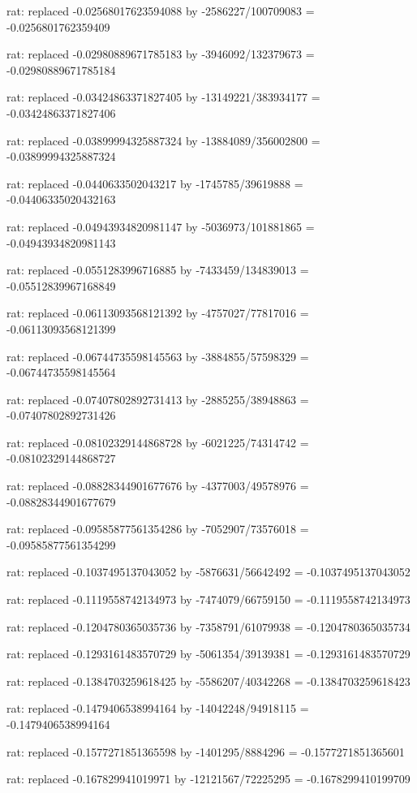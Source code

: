 \documentclass[a4paper,10pt]{article}
\begin{document}
\begin{eulernotebook}
\begin{eulercomment}
\begin{eulercomment}
\begin{eulercomment}
\begin{eulercomment}
\begin{eulercomment}
\begin{eulercomment}
\begin{eulercomment}
\begin{eulercomment}
\begin{eulercomment}
\begin{eulercomment}
\begin{eulercomment}
\begin{eulercomment}
\begin{eulercomment}
\begin{eulercomment}
\begin{eulercomment}
\begin{eulercomment}
\begin{euleroutput}
  rat: replaced -0.02568017623594088 by -2586227/100709083 = -0.0256801762359409
  
  rat: replaced -0.02980889671785183 by -3946092/132379673 = -0.02980889671785184
  
  rat: replaced -0.03424863371827405 by -13149221/383934177 = -0.03424863371827406
  
  rat: replaced -0.03899994325887324 by -13884089/356002800 = -0.03899994325887324
  
  rat: replaced -0.0440633502043217 by -1745785/39619888 = -0.04406335020432163
  
  rat: replaced -0.04943934820981147 by -5036973/101881865 = -0.04943934820981143
  
  rat: replaced -0.0551283996716885 by -7433459/134839013 = -0.05512839967168849
  
  rat: replaced -0.06113093568121392 by -4757027/77817016 = -0.06113093568121399
  
  rat: replaced -0.06744735598145563 by -3884855/57598329 = -0.06744735598145564
  
  rat: replaced -0.07407802892731413 by -2885255/38948863 = -0.07407802892731426
  
  rat: replaced -0.08102329144868728 by -6021225/74314742 = -0.08102329144868727
  
  rat: replaced -0.08828344901677676 by -4377003/49578976 = -0.08828344901677679
  
  rat: replaced -0.09585877561354286 by -7052907/73576018 = -0.09585877561354299
  
  rat: replaced -0.1037495137043052 by -5876631/56642492 = -0.1037495137043052
  
  rat: replaced -0.1119558742134973 by -7474079/66759150 = -0.1119558742134973
  
  rat: replaced -0.1204780365035736 by -7358791/61079938 = -0.1204780365035734
  
  rat: replaced -0.1293161483570729 by -5061354/39139381 = -0.1293161483570729
  
  rat: replaced -0.1384703259618425 by -5586207/40342268 = -0.1384703259618423
  
  rat: replaced -0.1479406538994164 by -14042248/94918115 = -0.1479406538994164
  
  rat: replaced -0.1577271851365598 by -1401295/8884296 = -0.1577271851365601
  
  rat: replaced -0.167829941019971 by -12121567/72225295 = -0.1678299410199709
  

\end{euleroutput}
\end{eulercomment}
\end{eulercomment}
\end{eulercomment}
\end{eulercomment}
\end{eulercomment}
\end{eulercomment}
\end{eulercomment}
\end{eulercomment}
\end{eulercomment}
\end{eulercomment}
\end{eulercomment}
\end{eulercomment}
\end{eulercomment}
\end{eulercomment}
\end{eulercomment}
\end{eulercomment}
\end{eulernotebook}
\end{document}
